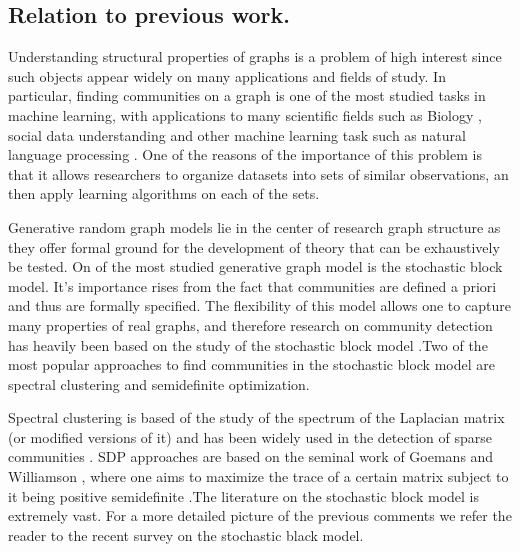 \documentclass[12pt]{amsart}
\theoremstyle{remark}
\newcommand{\mv}[1]{{\color{red} \sf $\clubsuit\clubsuit\clubsuit$ Mauricio: [#1]}}
\begin{document}
\subsection{Relation to previous work.}


Understanding structural properties of graphs is a problem of high interest since such objects appear widely on many applications and fields of study. In particular, finding communities on a graph is one of the most studied tasks in machine learning, with  applications to many scientific fields such as Biology \cite{cabreros2016detecting, cline2007integration,xu2002clustering}, social data understanding \cite{domingos2001mining,mishra2007clustering,newman2002random} and other machine learning task such as natural language processing \cite{collobert2011natural,ratinov2009design}. One of the reasons of the importance of this problem is that it allows researchers to organize datasets into sets of similar observations, an then apply learning algorithms on each of the sets.  

Generative random graph models lie in the center of research graph structure as they offer formal ground for the development of theory that can be exhaustively be tested. On of the most studied generative graph model is the stochastic block model. It's importance rises from the fact that communities are defined a priori and thus are formally specified. The flexibility of this model allows one to capture many properties of real graphs, and therefore research on community detection has heavily been based on the study of the stochastic block model \cite{abbe2017community}.Two of the most popular approaches to find communities in the stochastic block model are spectral clustering and semidefinite optimization.

Spectral clustering is based of the study of the spectrum of the Laplacian matrix (or modified versions of it) and has been widely used in the detection of sparse communities \cite{bordenave2015non, chin2015stochastic,krzakala2013spectral, massoulie2014community}. 
SDP approaches are based on the seminal work of Goemans and Williamson \cite{goemans1995improved},
where one aims to maximize the trace of a certain matrix subject to it being positive semidefinite \cite{abbe2016exact,guedon2016community, montanari2016semidefinite}.The literature on the stochastic block model is extremely vast. For a more detailed picture of the previous comments we refer the reader to the recent survey on the stochastic black model\cite{abbe2017community}.
\end{document}
